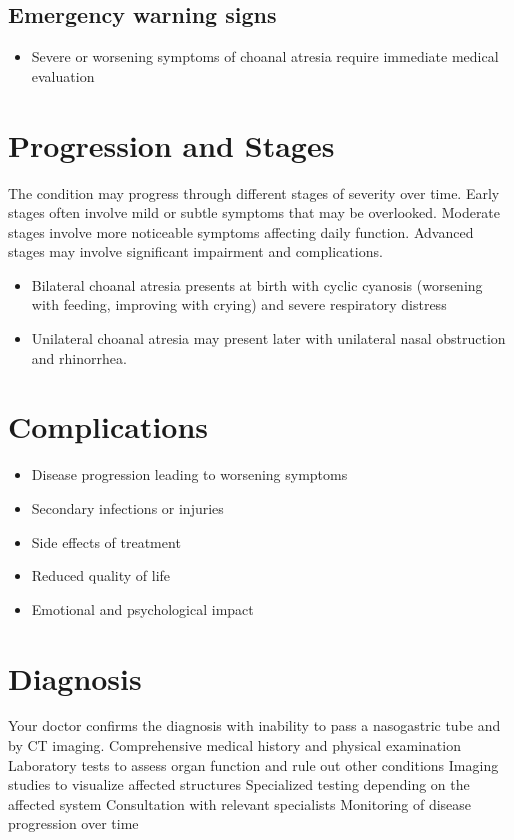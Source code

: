 \subsection{Emergency warning signs}
\begin{itemize}[noitemsep]
  \item Severe or worsening symptoms of choanal atresia require immediate medical evaluation
\end{itemize}
\section{Progression and Stages}
The condition may progress through different stages of severity over time. Early stages often involve mild or subtle symptoms that may be overlooked. Moderate stages involve more noticeable symptoms affecting daily function. Advanced stages may involve significant impairment and complications.

\begin{itemize}[noitemsep]
  \item Bilateral choanal atresia presents at birth with cyclic cyanosis (worsening with feeding, improving with crying) and severe respiratory distress
  \item Unilateral choanal atresia may present later with unilateral nasal obstruction and rhinorrhea.
\end{itemize}
\section{Complications}
\begin{itemize}[noitemsep]
  \item Disease progression leading to worsening symptoms
  \item Secondary infections or injuries
  \item Side effects of treatment
  \item Reduced quality of life
  \item Emotional and psychological impact
\end{itemize}
\section{Diagnosis}
Your doctor confirms the diagnosis with inability to pass a nasogastric tube and by CT imaging. Comprehensive medical history and physical examination Laboratory tests to assess organ function and rule out other conditions Imaging studies to visualize affected structures Specialized testing depending on the affected system Consultation with relevant specialists Monitoring of disease progression over time


